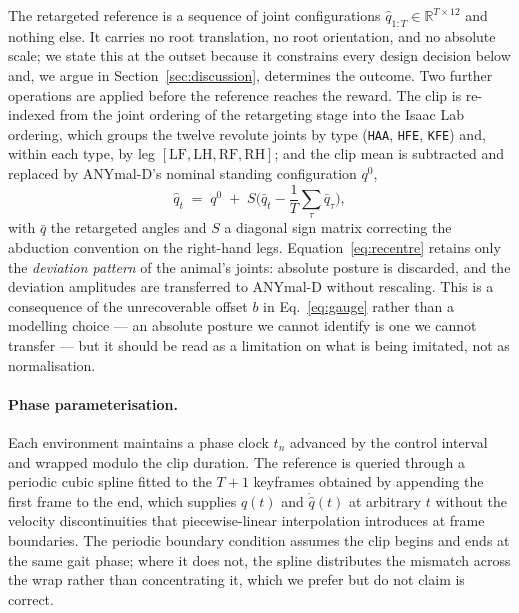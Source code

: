 \documentclass{article}
\theoremstyle{plain}
\theoremstyle{definition}
\theoremstyle{remark}
\begin{document}
The retargeted reference is a sequence of joint configurations
$\hat{q}_{1:T} \in \mathbb{R}^{T \times 12}$ and nothing else. It carries no
root translation, no root orientation, and no absolute scale; we state this at
the outset because it constrains every design decision below and, we argue in
Section~\ref{sec:discussion}, determines the outcome. Two further operations
are applied before the reference reaches the reward. The clip is re-indexed
from the joint ordering of the retargeting stage into the Isaac Lab ordering,
which groups the twelve revolute joints by type (\texttt{HAA}, \texttt{HFE},
\texttt{KFE}) and, within each type, by leg $[\mathrm{LF}, \mathrm{LH},
\mathrm{RF}, \mathrm{RH}]$; and the clip mean is subtracted and replaced by
ANYmal-D's nominal standing configuration $q^{0}$,
\begin{equation}
    \hat{q}_t \;=\; q^{0} \;+\; S\big( \bar{q}_t - \textstyle\frac{1}{T}\sum_{\tau} \bar{q}_\tau \big),
    \label{eq:recentre}
\end{equation}
with $\bar{q}$ the retargeted angles and $S$ a diagonal sign matrix correcting
the abduction convention on the right-hand legs. Equation~\eqref{eq:recentre}
retains only the \emph{deviation pattern} of the animal's joints: absolute
posture is discarded, and the deviation amplitudes are transferred to ANYmal-D
without rescaling. This is a consequence of the unrecoverable offset $b$ in
Eq.~\eqref{eq:gauge} rather than a modelling choice --- an absolute posture we
cannot identify is one we cannot transfer --- but it should be read as a
limitation on what is being imitated, not as normalisation.
 
\paragraph{Phase parameterisation.} Each environment maintains a phase clock
$t_n$ advanced by the control interval and wrapped modulo the clip duration.
The reference is queried through a periodic cubic spline fitted to the $T{+}1$
keyframes obtained by appending the first frame to the end, which supplies
$\hat{q}(t)$ and $\dot{\hat{q}}(t)$ at arbitrary $t$ without the velocity
discontinuities that piecewise-linear interpolation introduces at frame
boundaries. The periodic boundary condition assumes the clip begins and ends
at the same gait phase; where it does not, the spline distributes the mismatch
across the wrap rather than concentrating it, which we prefer but do not claim
is correct.
 
\end{document}
